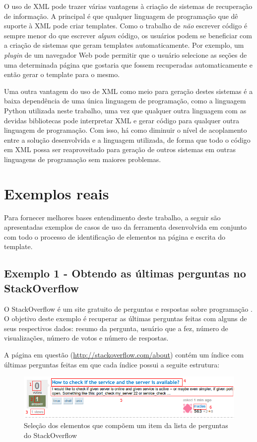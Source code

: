 O uso de XML pode trazer várias vantagens à criação de sistemas de recuperação de informação. A principal é que qualquer linguagem de programação que dê suporte à XML pode criar templates. Como o trabalho de \emph{não} escrever código é sempre menor do que escrever \emph{algum} código, os usuários podem se beneficiar com a criação de sistemas que geram templates automaticamente. Por exemplo, um \emph{plugin} de um navegador Web pode permitir que o usuário selecione as seções de uma determinada página que gostaria que fossem recuperadas automaticamente e então gerar o template para o mesmo. 

Uma outra vantagem do uso de XML como meio para geração destes sistemas é a baixa dependência de uma única linguagem de programação, como a linguagem Python utilizada neste trabalho, uma vez que qualquer outra linguagem com as devidas bibliotecas pode interpretar XML e gerar código para qualquer outra linguagem de programação. Com isso, há como diminuir o nível de acoplamento entre a solução desenvolvida e a linguagem utilizada, de forma que todo o código em XML possa ser reaproveitado para geração de outros sistemas em outras linguagens de programação sem maiores problemas.

\pagebreak
\section{Exemplos reais}

Para fornecer melhores bases entendimento deste trabalho, a seguir são apresentadas exemplos de casos de uso da ferramenta desenvolvida em conjunto com todo o processo de identificação de elementos na página e escrita do template.

\subsection{Exemplo 1 - Obtendo as últimas perguntas no StackOverflow}

O StackOverflow é um site gratuito de perguntas e respostas sobre programação \cite{stackoverflow}. O objetivo deste exemplo é recuperar as últimas perguntas feitas com alguns de seus respectivos dados: resumo da pergunta, usuário que a fez, número de visualizações, número de votos e número de respostas.

A página em questão (\url{http://stackoverflow.com/about}) contém um índice com últimas perguntas feitas em que cada índice possui a seguite estrutura:

\begin{figure} [ht]
	\centering
	\includegraphics[scale=0.8]{stackoverflow.png}
	\caption{Seleção dos elementos que compõem um item da lista de perguntas do StackOverflow}
	\label{stackoverflow}
\end{figure}


